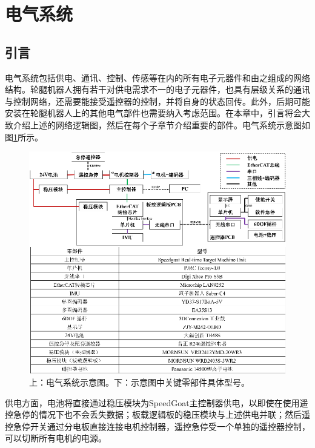 \section{电气系统}

\subsection{引言}

电气系统包括供电、通讯、控制、传感等在内的所有电子元器件和由之组成的网络结构。轮腿机器人拥有若干对供电需求不一的电子元器件，也具有层级关系的通讯与控制网络，还需要能接受遥控器的控制，并将自身的状态回传。此外，后期可能安装在轮腿机器人上的其他电气部件也需要纳入考虑范围。在本章中，引言将会大致介绍上述的网络逻辑图，然后在每个子章节介绍重要的部件。电气系统示意图如图\ref{fig:sec3-sys}所示。

\begin{figure}[h!]
  \centering
  \includegraphics[width=0.9\linewidth]{figures/Sec3/sys.png}
  \caption{
  上：电气系统示意图。下：示意图中关键零部件具体型号。
  }
  \label{fig:sec3-sys}
   \vspace{6pt}
\end{figure}

供电方面，电池将直接通过稳压模块为SpeedGoat主控制器供电，以即使在使用遥控急停的情况下也不会丢失数据；板载逻辑板的稳压模块与上述供电并联；然后遥控急停开关通过分电板直接连接电机控制器，遥控急停受一个单独的遥控器控制，可以切断所有电机的电源。

